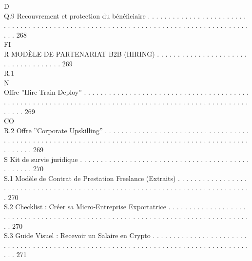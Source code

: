 \documentclass[12pt,landscape,a4paper]{article}
\begin{document}
\vspace{0.5em}
\vspace{0.5em}
\vspace{0.5em}
\vspace{0.5em}
D\\
Q.9     Recouvrement et protection du bénéficiaire . . . . . . . . . . . . . . . . . . . . . . . . . . . . . . . . . . . . . . . . . . . . . . . . . . . . . . . . . . . . . . . . . . . . . . . . . . . . . . . . . . . . . . 268\\
\vspace{0.5em}
\vspace{0.5em}
\vspace{0.5em}
\vspace{0.5em}
FI\\
R     MODÈLE DE PARTENARIAT B2B (HIRING) . . . . . . . . . . . . . . . . . . . . . . . . . . . . . . . . . . . . 269\\
R.1\\
N\\
Offre ”Hire Train Deploy” . . . . . . . . . . . . . . . . . . . . . . . . . . . . . . . . . . . . . . . . . . . . . . . . . . . . . . . . . . . . . . . . . . . . . . . . . . . . . . . . . . . . . . . . . . . . . . . . . . . . . . . . 269\\
CO\\
R.2     Offre ”Corporate Upskilling” . . . . . . . . . . . . . . . . . . . . . . . . . . . . . . . . . . . . . . . . . . . . . . . . . . . . . . . . . . . . . . . . . . . . . . . . . . . . . . . . . . . . . . . . . . . . . . . . . . . . . 269\\
\vspace{0.5em}
S     Kit de survie juridique . . . . . . . . . . . . . . . . . . . . . . . . . . . . . . . . . . . . . . . . . . . . . . . . 270\\
S.1     Modèle de Contrat de Prestation Freelance (Extraits) . . . . . . . . . . . . . . . . . . . . . . . . . . . . . . . . . . . . . . . . . . . . . . . . . . . . . . . . . . . . . . . . . . . . . . . . . . . . . 270\\
S.2     Checklist : Créer sa Micro-Entreprise Exportatrice . . . . . . . . . . . . . . . . . . . . . . . . . . . . . . . . . . . . . . . . . . . . . . . . . . . . . . . . . . . . . . . . . . . . . . . . . . . . . . . . 270\\
S.3     Guide Visuel : Recevoir un Salaire en Crypto . . . . . . . . . . . . . . . . . . . . . . . . . . . . . . . . . . . . . . . . . . . . . . . . . . . . . . . . . . . . . . . . . . . . . . . . . . . . . . . . . . . . . 271\\
\end{document}
